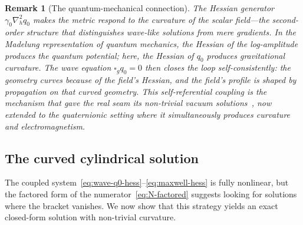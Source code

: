 \documentclass[pdflatex,sn-mathphys-num]{sn-jnl}
\theoremstyle{thmstyleone}%
\theoremstyle{thmstyletwo}%
\newtheorem{remark}[theorem]{Remark}
\theoremstyle{thmstylethree}%
\newcommand{\nn}{\nabla}
\numberwithin{equation}{section}
\begin{document}
\begin{remark}[The quantum-mechanical connection]
\label{rem:qm-connection}
The Hessian generator $\gamma_0\nn^2_h q_0$ makes the metric
respond to the \emph{curvature} of the scalar field---the
second-order structure that distinguishes wave-like solutions
from mere gradients.  In the Madelung representation of
quantum mechanics, the Hessian of the log-amplitude produces
the quantum potential; here, the Hessian of $q_0$ produces
gravitational curvature.  The wave equation
$\square_g q_0 = 0$ then closes the loop self-consistently:
the geometry curves because of the field's Hessian, and
the field's profile is shaped by propagation on that curved
geometry.  This self-referential coupling is the mechanism
that gave the real seam its non-trivial vacuum
solutions~\cite{seam1}, now extended to the quaternionic
setting where it simultaneously produces curvature
\emph{and} electromagnetism.
\end{remark}

\subsection{The curved cylindrical solution}
\label{sec:curved-cyl}

The coupled system~\eqref{eq:wave-q0-hess}--\eqref{eq:maxwell-hess}
is fully nonlinear, but the factored form of
the numerator~\eqref{eq:N-factored} suggests looking for
solutions where the bracket vanishes.  We now show that
this strategy yields an exact closed-form solution with
non-trivial curvature.
\end{document}
